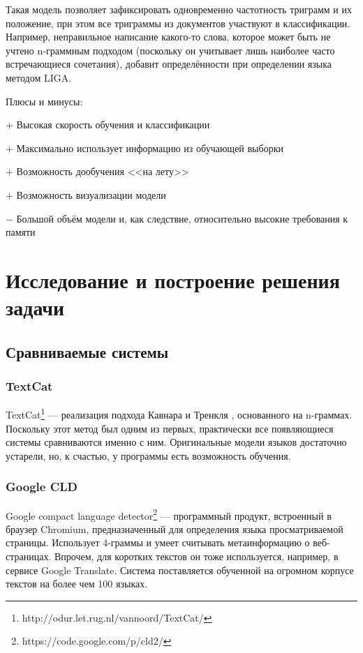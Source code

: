 \documentclass[a4paper, 14pt]{article}
\begin{document}
		Такая модель позволяет зафиксировать одновременно частотность триграмм и их положение, при этом все триграммы
		из документов участвуют в классификации. Например, неправильное написание какого-то слова, которое может быть не учтено n-граммным подходом (поскольку он
		учитывает лишь наиболее часто встречающиеся сочетания), добавит определённости при определении языка методом LIGA.		
		
		\noindent Плюсы и минусы:
		
		$+$ Высокая скорость обучения и классификации
		
		$+$ Максимально использует информацию из обучающей выборки
		
		$+$ Возможность дообучения <<на лету>>
		
		$+$ Возможность визуализации модели
		
		$-$ Большой объём модели и, как следствие, относительно высокие требования к памяти
			
\pagebreak

\section{Исследование и построение решения задачи}
		\subsection{Сравниваемые системы}
			\subsubsection{TextCat}
			TextCat\footnote{http://odur.let.rug.nl/vannoord/TextCat/} --- реализация подхода Кавнара и Тренкля \cite{canvar}, основанного на n-граммах.
			Поскольку этот метод был одним из первых, практически все появляющиеся системы сравниваются именно
			с ним. 
			Оригинальные модели языков достаточно устарели, но, к счастью, у программы есть возможность обучения.
			\subsubsection{Google CLD}
			Google compact language detector\footnote{https://code.google.com/p/cld2/} --- программный продукт, встроенный в браузер Chromium, 
			предназначенный для определения языка просматриваемой страницы. 
			Использует 4-граммы и умеет считывать метаинформацию
			о веб-страницах. Впрочем, для коротких текстов он тоже используется, например, в сервисе Google Translate. Система поставляется обученной
			на огромном корпусе текстов на более чем 100 языках.
\end{document}
